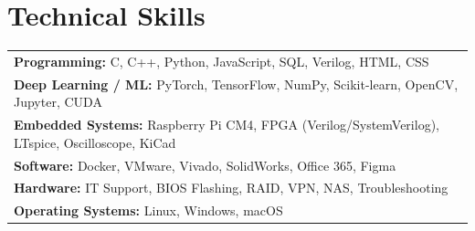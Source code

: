 \documentclass[letterpaper,11pt]{article}
\begin{document}
\section*{Technical Skills}
\begin{tabularx}{\textwidth}{X}
\textbf{Programming:} C, C++, Python, JavaScript, SQL, Verilog, HTML, CSS \\
\textbf{Deep Learning / ML:} PyTorch, TensorFlow, NumPy, Scikit-learn, OpenCV, Jupyter, CUDA \\
\textbf{Embedded Systems:} Raspberry Pi CM4, FPGA (Verilog/SystemVerilog), LTspice, Oscilloscope, KiCad \\
\textbf{Software:} Docker, VMware, Vivado, SolidWorks, Office 365, Figma \\
\textbf{Hardware:} IT Support, BIOS Flashing, RAID, VPN, NAS, Troubleshooting \\
\textbf{Operating Systems:} Linux, Windows, macOS \\
\end{tabularx}
\end{document}
